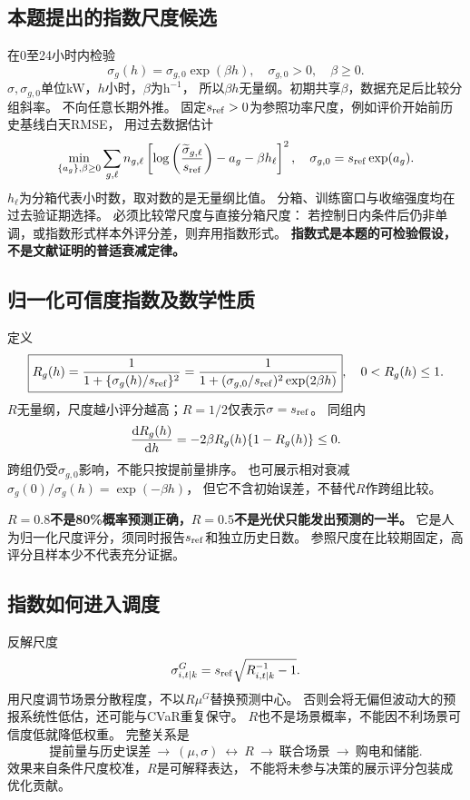 \documentclass[UTF8,11pt]{ctexart}
\begin{document}
\subsection{本题提出的指数尺度候选}
在0至24小时内检验
\begin{equation}\label{eq:exp}
 \sigma_g(h)=\sigma_{g,0}\exp(\beta h),\quad
 \sigma_{g,0}>0,\quad\beta\geq0 .
\end{equation}
$\sigma,\sigma_{g,0}$单位kW，$h$小时，$\beta$为$\mathrm h^{-1}$，
所以$\beta h$无量纲。初期共享$\beta$，数据充足后比较分组斜率。
不向任意长期外推。
固定$s_{\rm ref}>0$为参照功率尺度，例如评价开始前历史基线白天RMSE，
用过去数据估计
\begin{equation}\label{eq:fit}
 \min_{\{a_g\},\beta\geq0}\sum_{g,\ell}n_{g,\ell}
 \left[\log\left(\frac{\widetilde\sigma_{g,\ell}}{s_{\rm ref}}\right)
       -a_g-\beta h_\ell\right]^2,\quad
 \sigma_{g,0}=s_{\rm ref}\exp(a_g).
\end{equation}
$h_\ell$为分箱代表小时数，取对数的是无量纲比值。
分箱、训练窗口与收缩强度均在过去验证期选择。
必须比较常尺度与直接分箱尺度：
若控制日内条件后仍非单调，或指数形式样本外评分差，则弃用指数形式。
\textbf{指数式是本题的可检验假设，不是文献证明的普适衰减定律。}

\subsection{归一化可信度指数及数学性质}
定义
\begin{equation}\label{eq:R}
 \boxed{R_g(h)=\frac1{1+\{\sigma_g(h)/s_{\rm ref}\}^2}
 =\frac1{1+(\sigma_{g,0}/s_{\rm ref})^2\exp(2\beta h)}},
 \quad 0<R_g(h)\leq1 .
\end{equation}
$R$无量纲，尺度越小评分越高；$R=1/2$仅表示$\sigma=s_{\rm ref}$。
同组内
\begin{equation}
 \frac{{\rm d}R_g(h)}{{\rm d}h}=-2\beta R_g(h)\{1-R_g(h)\}\leq0.
\end{equation}
跨组仍受$\sigma_{g,0}$影响，不能只按提前量排序。
也可展示相对衰减$\sigma_g(0)/\sigma_g(h)=\exp(-\beta h)$，
但它不含初始误差，不替代$R$作跨组比较。

\textbf{$R=0.8$不是80\%概率预测正确，$R=0.5$不是光伏只能发出预测的一半。}
它是人为归一化尺度评分，须同时报告$s_{\rm ref}$和独立历史日数。
参照尺度在比较期固定，高评分且样本少不代表充分证据。

\subsection{指数如何进入调度}
反解尺度
\begin{equation}\label{eq:Rscale}
 \sigma^G_{i,t|k}=s_{\rm ref}\sqrt{R_{i,t|k}^{-1}-1}.
\end{equation}
用尺度调节场景分散程度，不以$R\mu^G$替换预测中心。
否则会将无偏但波动大的预报系统性低估，还可能与CVaR重复保守。
$R$也不是场景概率，不能因不利场景可信度低就降低权重。
完整关系是
\begin{equation}
 \text{提前量与历史误差}\ \longrightarrow\ (\mu,\sigma)
 \ \longleftrightarrow\ R
 \ \longrightarrow\ \text{联合场景}
 \ \longrightarrow\ \text{购电和储能}.
\end{equation}
效果来自条件尺度校准，$R$是可解释表达，
不能将未参与决策的展示评分包装成优化贡献。
\end{document}
